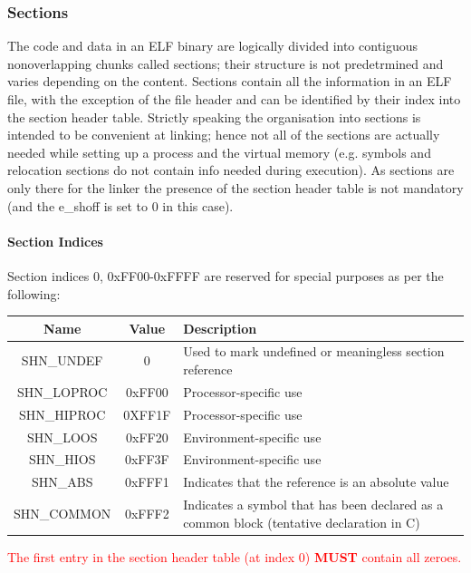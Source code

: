 \documentclass[paper=a4, fontsize=11pt]{report} %
\numberwithin{equation}{section} %
\numberwithin{figure}{section} %
\numberwithin{table}{section} %
\begin{document}
\subsubsection{Sections}
The code and data in an ELF binary are logically divided into contiguous 
nonoverlapping chunks called sections; their structure is not predetrmined and 
varies depending on the content.
Sections contain all the information in an ELF file, with the exception of the 
file header and can be identified by their index into the section header table. 
Strictly speaking the organisation into sections is intended to be convenient 
at linking; hence not all of the sections are actually needed while setting up 
a process and the virtual memory (e.g. symbols and relocation sections do not 
contain info needed during execution). As sections are only there for the 
linker the presence of the section header table is not mandatory (and the 
{\ttfamily e\_shoff} is set to 0 in this case).
\paragraph{Section Indices}
Section indices 0, 0xFF00-0xFFFF are reserved for special purposes as per the 
following:
\begin{center}
	\begin{tabular}{|c|c|p{6cm}|}
		\hline
		\textbf{Name} 	& \textbf{Value} 	& \textbf{Description}\\ \hline
		SHN\_UNDEF & 0 & Used to mark undefined or meaningless section 
		reference\\ \hline
		SHN\_LOPROC & 0xFF00 & Processor-specific use\\ \hline
		SHN\_HIPROC & 0XFF1F & Processor-specific use\\ \hline
		SHN\_LOOS & 0xFF20 & Environment-specific use\\ \hline
		SHN\_HIOS & 0xFF3F & Environment-specific use\\ \hline
		SHN\_ABS & 0xFFF1 & Indicates that the reference is an absolute value\\ 
		\hline
		SHN\_COMMON & 0xFFF2 & Indicates a symbol that has been declared as a 
		common block (tentative declaration in C)\\ \hline
	\end{tabular}
\end{center}
\textcolor{red}{The first entry in the section header table (at index 0) 
\textbf{MUST} contain all zeroes.}
\end{document}
